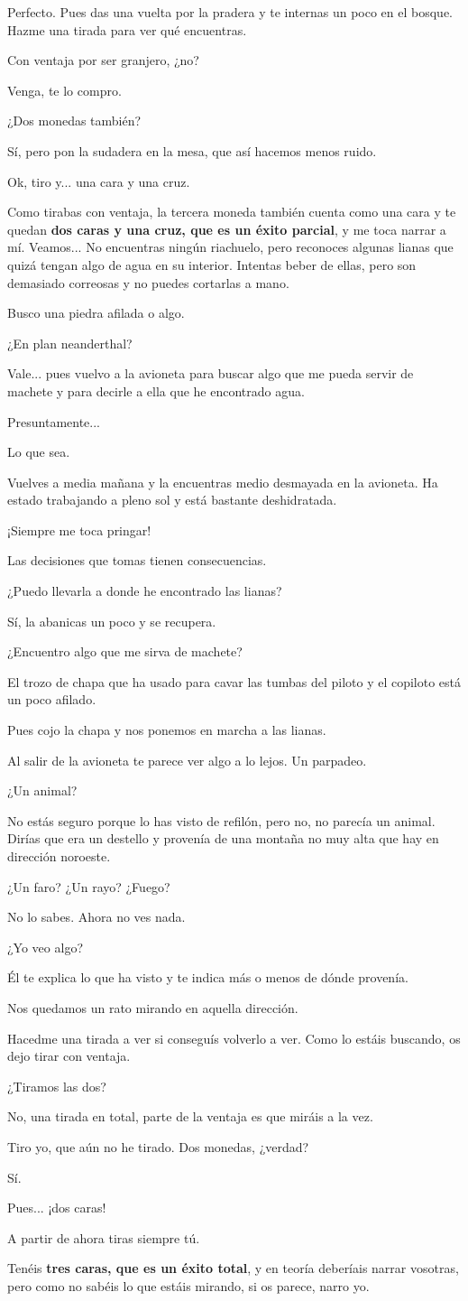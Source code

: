 \documentclass[10pt, a5paper, twocolumn]{article}
\newenvironment{dialogue}
    {\begin{description}[leftmargin=!,align=right,labelwidth=0.cm]}
    {\end{description}}
\newcommand\A{\item[\raisebox{-0.25em}{\scalebox{0.75}{\bctetraedre}}]}
\newcommand\B{\item[\raisebox{-0.25em}{\scalebox{0.75}{\bccube}}]}
\newcommand\E{\item[\raisebox{-0.25em}{\scalebox{0.75}{\bcicosaedre}}]}
\begin{document}
\begin{dialogue}
        \E Perfecto. Pues das una vuelta por la pradera y te internas un poco en el bosque. Hazme una tirada para ver qué encuentras.
        \B Con ventaja por ser granjero, ¿no?
        \E Venga, te lo compro.
        \B ¿Dos monedas también?
        \E Sí, pero pon la sudadera en la mesa, que así hacemos menos ruido.
        \B Ok, tiro y... una cara y una cruz.
        \E Como tirabas con ventaja, la tercera moneda también cuenta como una cara y te quedan \textbf{dos caras y una cruz, que es un éxito parcial}, y me toca narrar a mí. Veamos... No encuentras ningún riachuelo, pero reconoces algunas lianas que quizá tengan algo de agua en su interior. Intentas beber de ellas, pero son demasiado correosas y no puedes cortarlas a mano.
        \B Busco una piedra afilada o algo.
        \E ¿En plan neanderthal?
        \B Vale... pues vuelvo a la avioneta para buscar algo que me pueda servir de machete y para decirle a ella que he encontrado agua.
        \E Presuntamente...
        \B Lo que sea.
        \E Vuelves a media mañana y la encuentras medio desmayada en la avioneta. Ha estado trabajando a pleno sol y está bastante deshidratada.
        \A ¡Siempre me toca pringar!
        \E Las decisiones que tomas tienen consecuencias.
        \B ¿Puedo llevarla a donde he encontrado las lianas?
        \E Sí, la abanicas un poco y se recupera.
        \B ¿Encuentro algo que me sirva de machete?
        \E El trozo de chapa que ha usado para cavar las tumbas del piloto y el copiloto está un poco afilado.
        \B Pues cojo la chapa y nos ponemos en marcha a las lianas.
        \E Al salir de la avioneta te parece ver algo a lo lejos. Un parpadeo.
        \B ¿Un animal?
        \E No estás seguro porque lo has visto de refilón, pero no, no parecía un animal. Dirías que era un destello y provenía de una montaña no muy alta que hay en dirección noroeste.
        \B ¿Un faro? ¿Un rayo? ¿Fuego?
        \E No lo sabes. Ahora no ves nada.
        \A ¿Yo veo algo?
        \E Él te explica lo que ha visto y te indica más o menos de dónde provenía.
        \B Nos quedamos un rato mirando en aquella dirección.
        \E Hacedme una tirada a ver si conseguís volverlo a ver. Como lo estáis buscando, os dejo tirar con ventaja.
        \B ¿Tiramos las dos?
        \E No, una tirada en total, parte de la ventaja es que miráis a la vez.
        \A Tiro yo, que aún no he tirado. Dos monedas, ¿verdad?
        \E Sí.
        \A Pues... ¡dos caras!
        \B A partir de ahora tiras siempre tú.
        \E Tenéis \textbf{tres caras, que es un éxito total}, y en teoría deberíais narrar vosotras, pero como no sabéis lo que estáis mirando, si os parece, narro yo.

\end{dialogue}
\end{document}
